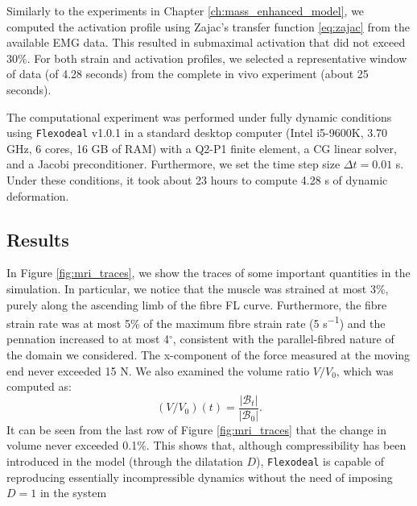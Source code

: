 \documentclass{sfuthesis}
\numberwithin{equation}{section}
\numberwithin{figure}{chapter}
\numberwithin{table}{chapter}
\theoremstyle{definition}
\newcommand{\B}{\mathcal{B}}
\begin{document}
Similarly to the experiments in Chapter \ref{ch:mass_enhanced_model}, we computed the activation profile using Zajac's transfer function \eqref{eq:zajac} from the available EMG data. This resulted in submaximal activation that did not exceed 30\%. For both strain and activation profiles, we selected a representative window of data (of 4.28 seconds) from the complete in vivo experiment (about 25 seconds).

The computational experiment was performed under fully dynamic conditions using \texttt{Flexodeal} v1.0.1 in a standard desktop computer (Intel i5-9600K, 3.70 GHz, 6 cores, 16 GB of RAM) with a Q2-P1 finite element, a CG linear solver, and a Jacobi preconditioner. Furthermore, we set the time step size $\Delta t  = 0.01$ s. Under these conditions, it took about 23 hours to compute 4.28 s of dynamic deformation.

\subsection{Results}

In Figure \ref{fig:mri_traces}, we show the traces of some important quantities in the simulation. In particular, we notice that the muscle was strained at most 3\%, purely along the ascending limb of the fibre FL curve. Furthermore, the fibre strain rate was at most 5\% of the maximum fibre strain rate (5 \unit{s^{-1}}) and the pennation increased to at most 4$^\circ$, consistent with the parallel-fibred nature of the domain we considered. The x-component of the force measured at the moving end never exceeded 15 N. We also examined the volume ratio $V/V_0$, which was computed as:
\[
(V/V_0)(t) = \frac{|\B_t|}{|\B_0|}.
\]
It can be seen from the last row of Figure \ref{fig:mri_traces} that the change in volume never exceeded 0.1\%. This shows that, although compressibility has been introduced in the model (through the dilatation $D$), \texttt{Flexodeal} is capable of reproducing essentially incompressible dynamics without the need of imposing $D = 1$ in the system
\end{document}
